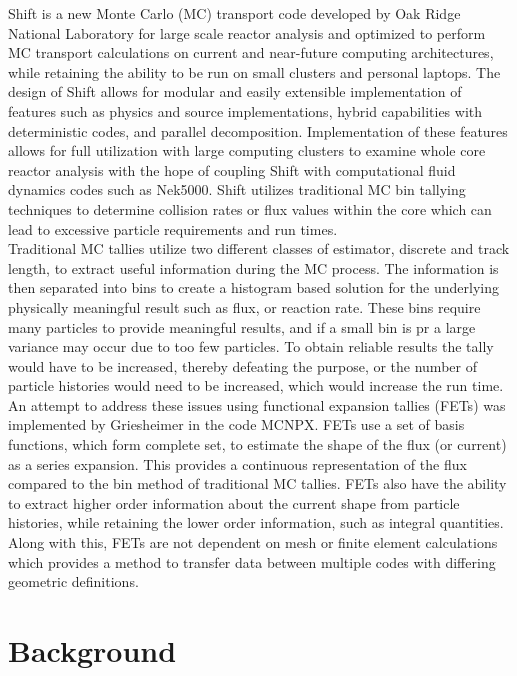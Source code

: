 \documentclass[10tma4paper]{article}
\begin{document}
 Shift is a new Monte Carlo (MC) transport code developed by Oak Ridge National Laboratory for large scale reactor analysis and optimized to perform MC transport calculations on current and near-future computing architectures, while retaining the ability to be run on small clusters and personal laptops. The design of Shift allows for modular and easily extensible implementation of features such as physics and source implementations, hybrid capabilities with deterministic codes, and parallel decomposition. Implementation of these features allows for full utilization with large computing clusters to examine whole core reactor analysis with the hope of coupling Shift with computational fluid dynamics codes such as Nek5000. Shift utilizes traditional MC bin tallying techniques to determine collision rates or flux values within the core which can lead to excessive particle requirements and run times.
\\
Traditional MC tallies utilize two different classes of estimator, discrete and track length, to extract useful information during the MC process. The information is then separated into bins to create a histogram based solution for the underlying physically meaningful result such as flux, or reaction rate. These bins require many particles to provide meaningful results, and if a small bin is pr a large variance may occur due to too few particles. To obtain reliable results the tally would have to be increased, thereby defeating the purpose, or the number of particle histories would need to be increased, which would increase the run time.
\\
An attempt to address these issues using functional expansion tallies (FETs) was implemented by Griesheimer in the code MCNPX. FETs use a set of basis functions, which form complete set, to estimate the shape of the flux (or current) as a series expansion. This provides a continuous representation of the flux compared to the bin method of traditional MC tallies. FETs also have the ability to extract higher order information about the current shape from particle histories, while retaining the lower order information, such as integral quantities. Along with this, FETs are not dependent on mesh or finite element calculations which provides a method to transfer data between multiple codes with differing geometric definitions.  
\\

\section{Background}\label{background}
\end{document}
